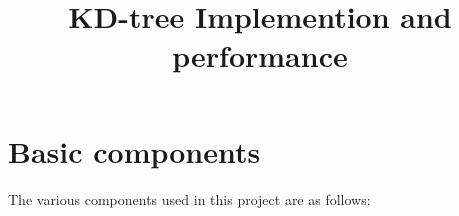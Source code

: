 \documentclass[11pt]{amsart}
\title{KD-tree Implemention and performance}
\begin{document}
\maketitle

\section{Basic components}

The various components used in this project are as follows:
\end{document}

